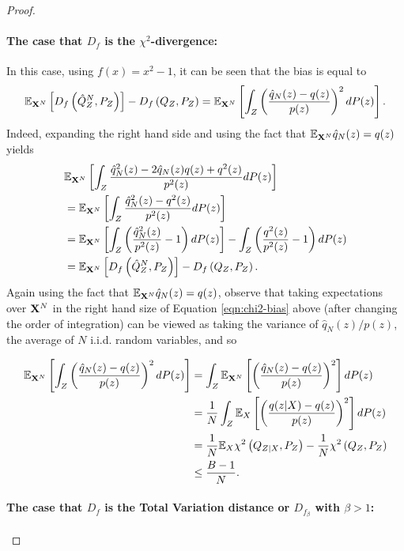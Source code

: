 \begin{proof}
\paragraph{The case that $D_f$ is the $\chi^2$-divergence:}
% 
In this case, using $f(x) = x^2-1$, it can be seen that the bias is equal to
\begin{align}\label{eqn:chi2-bias}
    \mathbb{E}_{\mathbf{X}^N} \left[ D_{f}\left( \hat{Q}_Z^N , P_Z\right)\right] - D_{f}\left( Q_{Z} , P_Z\right) = \mathbb{E}_{\mathbf{X}^N}\left[ \int_Z  \left(\frac{\hat{q}_N(z) - q(z)}{p(z)}\right)^2 dP(z) \right].
\end{align}
Indeed, expanding the right hand side and using the fact that $\mathbb{E}_{\mathbf{X}^N}\hat{q}_N(z) = q(z)$ yields
\begin{align*}
    &\mathbb{E}_{\mathbf{X}^N}\left[ \int_Z  \frac{\hat{q}^2_N(z) - 2\hat{q}_N(z)q(z) + q^2(z)}{p^2(z)} dP(z) \right]\\
    &=\mathbb{E}_{\mathbf{X}^N}\left[ \int_Z  \frac{\hat{q}^2_N(z) - q^2(z)}{p^2(z)} dP(z) \right]\\
    &=\mathbb{E}_{\mathbf{X}^N}\left[ \int_Z  \left(\frac{\hat{q}^2_N(z)}{p^2(z)} - 1 \right)dP(z) \right] - \int_Z  \left(\frac{q^2(z)}{p^2(z)} - 1\right) dP(z)\\
    &= \mathbb{E}_{\mathbf{X}^N} \left[ D_{f}\left( \hat{Q}_Z^N , P_Z\right)\right] - D_{f}\left( Q_{Z} , P_Z\right).
\end{align*}
Again using the fact that $\mathbb{E}_{\mathbf{X}^N}\hat{q}_N(z) = q(z)$, observe that taking expectations over $\mathbf{X}^N$ in the right hand size of Equation \ref{eqn:chi2-bias} above (after changing the order of integration) can be viewed as taking the variance of $\hat{q}_N(z)/p(z)$, the average of $N$ i.i.d. random variables, and so

\begin{align*}
 \mathbb{E}_{\mathbf{X}^N}\left[ \int_Z  \left(\frac{\hat{q}_N(z) - q(z)}{p(z)}\right)^2 dP(z) \right] &= \int_Z \mathbb{E}_{\mathbf{X}^N}\left[  \left(\frac{\hat{q}_N(z) - q(z)}{p(z)}\right)^2 \right] dP(z) \\
 &=\frac{1}{N} \int_Z \mathbb{E}_{X}\left[  \left(\frac{q(z|X) - q(z)}{p(z)}\right)^2 \right] dP(z) \\
 &= \frac{1}{N} \mathbb{E}_{X} \chi^2\left( Q_{Z|X} , P_Z \right) - \frac{1}{N} \chi^2\left( Q_{Z} , P_Z \right)\\
 &\leq \frac{B-1}{N}.
\end{align*}

\paragraph{The case that $D_f$ is the Total Variation distance or $D_{f_\beta}$ with $\beta>1$:}


\end{proof}
